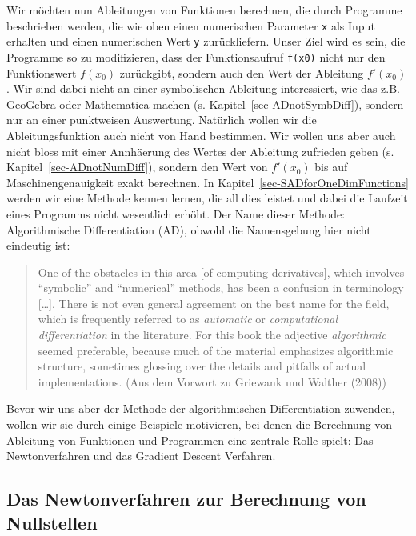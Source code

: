 \documentclass[
  letterpaper,
  DIV=11,
  oneside]{scrreprt}
\theoremstyle{definition}
\theoremstyle{definition}
\theoremstyle{remark}
\begin{document}
Wir möchten nun Ableitungen von Funktionen berechnen, die durch
Programme beschrieben werden, die wie oben einen numerischen Parameter
\texttt{x} als Input erhalten und einen numerischen Wert \texttt{y}
zurückliefern. Unser Ziel wird es sein, die Programme so zu
modifizieren, dass der Funktionsaufruf \texttt{f(x0)} nicht nur den
Funktionswert \(f(x_0)\) zurückgibt, sondern auch den Wert der Ableitung
\(f'(x_0)\). Wir sind dabei nicht an einer symbolischen Ableitung
interessiert, wie das z.B. GeoGebra oder Mathematica machen (s.
Kapitel~\ref{sec-ADnotSymbDiff}), sondern nur an einer punktweisen
Auswertung. Natürlich wollen wir die Ableitungsfunktion auch nicht von
Hand bestimmen. Wir wollen uns aber auch nicht bloss mit einer
Annhäerung des Wertes der Ableitung zufrieden geben (s.
Kapitel~\ref{sec-ADnotNumDiff}), sondern den Wert von \(f'(x_0)\) bis
auf Maschinengenauigkeit exakt berechnen. In
Kapitel~\ref{sec-SADforOneDimFunctions} werden wir eine Methode kennen
lernen, die all dies leistet und dabei die Laufzeit eines Programms
nicht wesentlich erhöht. Der Name dieser Methode: Algorithmische
Differentiation (AD), obwohl die Namensgebung hier nicht eindeutig ist:

\begin{quote}
One of the obstacles in this area {[}of computing derivatives{]}, which
involves ``symbolic'' and ``numerical'' methods, has been a confusion in
terminology {[}\ldots{]}. There is not even general agreement on the
best name for the field, which is frequently referred to as
\emph{automatic} or \emph{computational differentiation} in the
literature. For this book the adjective \emph{algorithmic} seemed
preferable, because much of the material emphasizes algorithmic
structure, sometimes glossing over the details and pitfalls of actual
implementations. (Aus dem Vorwort zu Griewank und Walther (2008))
\end{quote}

Bevor wir uns aber der Methode der algorithmischen Differentiation
zuwenden, wollen wir sie durch einige Beispiele motivieren, bei denen
die Berechnung von Ableitung von Funktionen und Programmen eine zentrale
Rolle spielt: Das Newtonverfahren und das Gradient Descent Verfahren.

\hypertarget{sec-Newtonverfahren1D}{%
\subsection{Das Newtonverfahren zur Berechnung von
Nullstellen}\label{sec-Newtonverfahren1D}}
\end{document}
